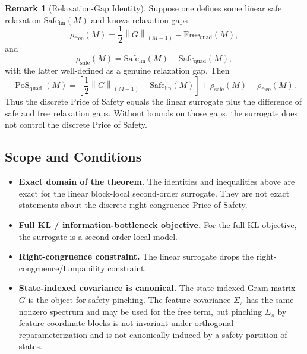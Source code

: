 \documentclass[12pt]{article}
\theoremstyle{definition}
\newtheorem{remark}[theorem]{Remark}
\DeclareMathOperator{\PoS}{PoS}
\newcommand{\KyF}[2]{\left\|#1\right\|_{(#2)}}
\newcommand{\PoSquad}{\PoS_{\mathrm{quad}}}
\begin{document}
\begin{remark}[Relaxation-Gap Identity]
\label{rem:relaxation-gap}
Suppose one defines some linear safe relaxation
$\mathrm{Safe}_{\mathrm{lin}}(M)$ and knows relaxation gaps
\[
\rho_{\mathrm{free}}(M)
=
\frac12
\KyF{G}{M-1}
-
\mathrm{Free}_{\mathrm{quad}}(M),
\]
and
\[
\rho_{\mathrm{safe}}(M)
=
\mathrm{Safe}_{\mathrm{lin}}(M)
-
\mathrm{Safe}_{\mathrm{quad}}(M),
\]
with the latter well-defined as a genuine relaxation gap.  Then
\[
\PoSquad(M)
=
\left[
\frac12
\KyF{G}{M-1}
-
\mathrm{Safe}_{\mathrm{lin}}(M)
\right]
+
\rho_{\mathrm{safe}}(M)
-
\rho_{\mathrm{free}}(M).
\]
Thus the discrete Price of Safety equals the linear surrogate plus the
difference of safe and free relaxation gaps.  Without bounds on those gaps, the
surrogate does not control the discrete Price of Safety.
\end{remark}

\subsection{Scope and Conditions}
\label{subsec:pos-scope}

\begin{itemize}[leftmargin=1.6em]
\item \textbf{Exact domain of the theorem.}
The identities and inequalities above are exact for the linear block-local
second-order surrogate.  They are not exact statements about the discrete
right-congruence Price of Safety.

\item \textbf{Full KL / information-bottleneck objective.}
For the full KL objective, the surrogate is a second-order local model.

\item \textbf{Right-congruence constraint.}
The linear surrogate drops the right-congruence/lumpability constraint.

\item \textbf{State-indexed covariance is canonical.}
The state-indexed Gram matrix $G$ is the object for safety pinching.  The
feature covariance $\Sigma_\pi$ has the same nonzero spectrum and may be used
for the free term, but pinching $\Sigma_\pi$ by feature-coordinate blocks is
not invariant under orthogonal reparameterization and is not canonically
induced by a safety partition of states.
\end{itemize}
\end{document}
